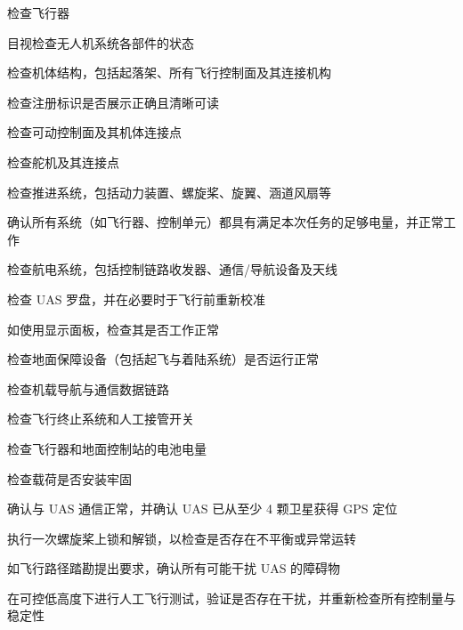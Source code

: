 \begin{checklist}
    \item 检查飞行器
    \begin{checklist}
        \item 目视检查无人机系统各部件的状态
        \item 检查机体结构，包括起落架、所有飞行控制面及其连接机构
        \item 检查注册标识是否展示正确且清晰可读
        \item 检查可动控制面及其机体连接点
        \item 检查舵机及其连接点
        \item 检查推进系统，包括动力装置、螺旋桨、旋翼、涵道风扇等
    \end{checklist}
    \item 确认所有系统（如飞行器、控制单元）都具有满足本次任务的足够电量，并正常工作
    \item 检查航电系统，包括控制链路收发器、通信/导航设备及天线
    \item 检查 UAS 罗盘，并在必要时于飞行前重新校准
    \item 如使用显示面板，检查其是否工作正常
    \item 检查地面保障设备（包括起飞与着陆系统）是否运行正常
    \item 检查机载导航与通信数据链路
    \item 检查飞行终止系统和人工接管开关
    \item 检查飞行器和地面控制站的电池电量
    \item 检查载荷是否安装牢固
    \item 确认与 UAS 通信正常，并确认 UAS 已从至少 4 颗卫星获得 GPS 定位
    \item 执行一次螺旋桨上锁和解锁，以检查是否存在不平衡或异常运转
    \item 如飞行路径踏勘提出要求，确认所有可能干扰 UAS 的障碍物
    \item 在可控低高度下进行人工飞行测试，验证是否存在干扰，并重新检查所有控制量与稳定性
\end{checklist}

